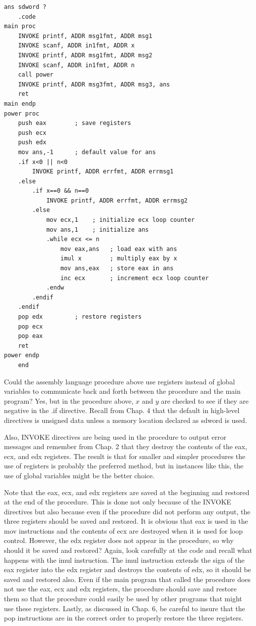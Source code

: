 \documentclass[10pt]{book}
\begin{document}
\begin{verbatim}
ans sdword ?
    .code
main proc
    INVOKE printf, ADDR msg1fmt, ADDR msg1
    INVOKE scanf, ADDR in1fmt, ADDR x
    INVOKE printf, ADDR msg1fmt, ADDR msg2
    INVOKE scanf, ADDR in1fmt, ADDR n
    call power
    INVOKE printf, ADDR msg3fmt, ADDR msg3, ans
    ret
main endp
power proc
    push eax        ; save registers
    push ecx
    push edx
    mov ans,-1      ; default value for ans
    .if x<0 || n<0
        INVOKE printf, ADDR errfmt, ADDR errmsg1
    .else
        .if x==0 && n==0
            INVOKE printf, ADDR errfmt, ADDR errmsg2
        .else
            mov ecx,1    ; initialize ecx loop counter
            mov ans,1    ; initialize ans
            .while ecx <= n
                mov eax,ans   ; load eax with ans
                imul x        ; multiply eax by x
                mov ans,eax   ; store eax in ans
                inc ecx       ; increment ecx loop counter
            .endw
        .endif
    .endif
    pop edx         ; restore registers
    pop ecx
    pop eax
    ret
power endp
    end
\end{verbatim}

Could the assembly language procedure above use registers instead of global variables to communicate back and forth between the procedure and the main program? Yes, but in the procedure above, $x$ and $y$ are checked to see if they are negative in the .if directive. Recall from Chap. 4 that the default in high-level directives is unsigned data unless a memory location declared as sdword is used.

Also, INVOKE directives are being used in the procedure to output error messages and remember from Chap. 2 that they destroy the contents of the eax, ecx, and edx registers. The result is that for smaller and simpler procedures the use of registers is probably the preferred method, but in instances like this, the use of global variables might be the better choice.

Note that the eax, ecx, and edx registers are saved at the beginning and restored at the end of the procedure. This is done not only because of the INVOKE directives but also because even if the procedure did not perform any output, the three registers should be saved and restored. It is obvious that eax is used in the mov instructions and the contents of ecx are destroyed when it is used for loop control. However, the edx register does not appear in the procedure, so why should it be saved and restored? Again, look carefully at the code and recall what happens with the imul instruction. The imul instruction extends the sign of the eax register into the edx register and destroys the contents of edx, so it should be saved and restored also. Even if the main program that called the procedure does not use the eax, ecx and edx registers, the procedure should save and restore them so that the procedure could easily be used by other programs that might use these registers. Lastly, as discussed in Chap. 6, be careful to insure that the pop instructions are in the correct order to properly restore the three registers.
\end{document}
